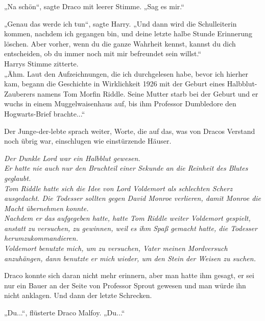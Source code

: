 {„Na schön“, sagte Draco mit leerer Stimme. „Sag es mir.“

„Genau das werde ich tun“, sagte Harry. „Und dann wird die Schulleiterin kommen, nachdem ich gegangen bin, und deine letzte halbe Stunde Erinnerung löschen. Aber vorher, wenn du die ganze Wahrheit kennst, kannst du dich entscheiden, ob du immer noch mit mir befreundet sein willst.“\\ Harrys Stimme zitterte.\\ „Ähm. Laut den Aufzeichnungen, die ich durchgelesen habe, bevor ich hierher kam, begann die Geschichte in Wirklichkeit 1926 mit der Geburt eines Halbblut-Zauberers namens Tom Morfin Riddle. Seine Mutter starb bei der Geburt und er wuchs in einem Muggelwaisenhaus auf, bis ihm Professor Dumbledore den Hogwarts-Brief brachte...“

Der Junge-der-lebte sprach weiter, Worte, die auf das, was von Dracos Verstand noch übrig war, einschlugen wie einstürzende Häuser.

\emph{Der Dunkle Lord war ein Halbblut gewesen.}\\ \emph{Er hatte nie auch nur den Bruchteil einer Sekunde an die Reinheit des Blutes geglaubt.}\\ \emph{Tom Riddle hatte sich die Idee von Lord Voldemort als schlechten Scherz ausgedacht. Die Todesser sollten gegen David Monroe verlieren, damit Monroe die Macht übernehmen konnte.}\\ \emph{Nachdem er das aufgegeben hatte, hatte Tom Riddle weiter Voldemort gespielt, anstatt zu versuchen, zu gewinnen, weil es ihm Spaß gemacht hatte, die Todesser herumzukommandieren.}\\ \emph{Voldemort benutzte mich, um zu versuchen, Vater meinen Mordversuch anzuhängen, dann benutzte er mich wieder, um den Stein der Weisen zu suchen.}

Draco konnte sich daran nicht mehr erinnern, aber man hatte ihm gesagt, er sei nur ein Bauer an der Seite von Professor Sprout gewesen und man würde ihn nicht anklagen. Und dann der letzte Schrecken.

„Du...“, flüsterte Draco Malfoy. „Du...“

}
